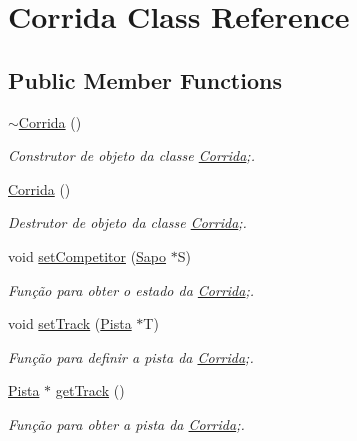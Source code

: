 \hypertarget{class_corrida}{}\section{Corrida Class Reference}
\label{class_corrida}
\subsection*{Public Member Functions}
\begin{DoxyCompactItemize}
\item 
\mbox{\hyperlink{class_corrida_ac307c46d186eb20b4bc6f600bd7c575a}{$\sim$\+Corrida}} ()
\begin{DoxyCompactList}\small\item\em Construtor de objeto da classe \mbox{\hyperlink{class_corrida}{Corrida}};. \end{DoxyCompactList}\item 
\mbox{\hyperlink{class_corrida_a74d4f707603910aed96f3acd8ee4bc62}{Corrida}} ()
\begin{DoxyCompactList}\small\item\em Destrutor de objeto da classe \mbox{\hyperlink{class_corrida}{Corrida}};. \end{DoxyCompactList}\item 
void \mbox{\hyperlink{class_corrida_a11e1744d2bd8c61053822b45e31d8368}{set\+Competitor}} (\mbox{\hyperlink{class_sapo}{Sapo}} $\ast$S)
\begin{DoxyCompactList}\small\item\em Função para obter o estado da \mbox{\hyperlink{class_corrida}{Corrida}};. \end{DoxyCompactList}\item 
void \mbox{\hyperlink{class_corrida_a828591ae64bb090f267b3f8612838c25}{set\+Track}} (\mbox{\hyperlink{class_pista}{Pista}} $\ast$T)
\begin{DoxyCompactList}\small\item\em Função para definir a pista da \mbox{\hyperlink{class_corrida}{Corrida}};. \end{DoxyCompactList}\item 
\mbox{\hyperlink{class_pista}{Pista}} $\ast$ \mbox{\hyperlink{class_corrida_a9f47d8a01df3c59c3597b75bbb865458}{get\+Track}} ()
\begin{DoxyCompactList}\small\item\em Função para obter a pista da \mbox{\hyperlink{class_corrida}{Corrida}};. \end{DoxyCompactList}\item 

\end{DoxyCompactItemize}
